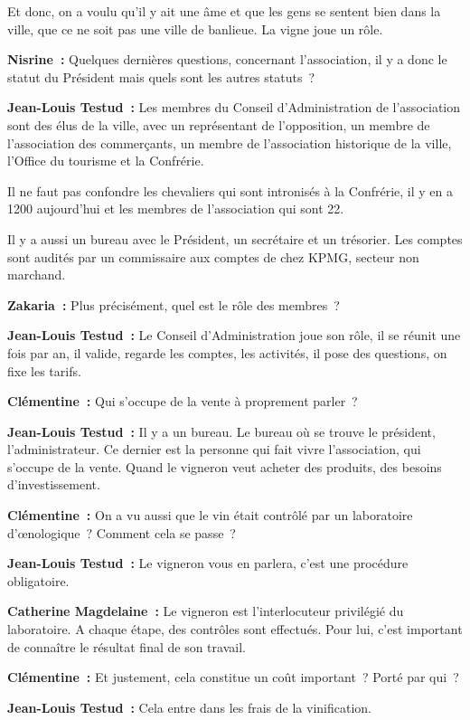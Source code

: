 \documentclass[a4paper, titlepage]{report}
\begin{document}
Et donc, on a voulu qu'il y ait une âme et que les gens se sentent bien
dans la ville, que ce ne soit pas une ville de banlieue. La vigne joue
un rôle.

\textbf{Nisrine~:} Quelques dernières questions, concernant
l'association, il y a donc le statut du Président mais quels sont les
autres statuts~?

\textbf{Jean-Louis Testud~:} Les membres du Conseil d'Administration de
l'association sont des élus de la ville, avec un représentant de
l'opposition, un membre de l'association des commerçants, un membre de
l'association historique de la ville, l'Office du tourisme et la
Confrérie.

Il ne faut pas confondre les chevaliers qui sont intronisés à la
Confrérie, il y en a 1200 aujourd'hui et les membres de l'association
qui sont 22.

Il y a aussi un bureau avec le Président, un secrétaire et un trésorier.
Les comptes sont audités par un commissaire aux comptes de chez KPMG,
secteur non marchand.

\textbf{Zakaria~:} Plus précisément, quel est le rôle des membres~?

\textbf{Jean-Louis Testud~:} Le Conseil d'Administration joue son rôle,
il se réunit une fois par an, il valide, regarde les comptes, les
activités, il pose des questions, on fixe les tarifs.

\textbf{Clémentine~:} Qui s'occupe de la vente à proprement parler~?

\textbf{Jean-Louis Testud~:} Il y a un bureau. Le bureau où se trouve le
président, l'administrateur. Ce dernier est la personne qui fait vivre
l'association, qui s'occupe de la vente. Quand le vigneron veut acheter
des produits, des besoins d'investissement.

\textbf{Clémentine~:} On a vu aussi que le vin était contrôlé par un
laboratoire d'œnologique~? Comment cela se passe~?

\textbf{Jean-Louis Testud~:} Le vigneron vous en parlera, c'est une
procédure obligatoire.

\textbf{Catherine Magdelaine~:} Le vigneron est l'interlocuteur
privilégié du laboratoire. A chaque étape, des contrôles sont effectués.
Pour lui, c'est important de connaître le résultat final de son travail.

\textbf{Clémentine~:} Et justement, cela constitue un coût important~?
Porté par qui~?

\textbf{Jean-Louis Testud~:} Cela entre dans les frais de la
vinification.
\end{document}
